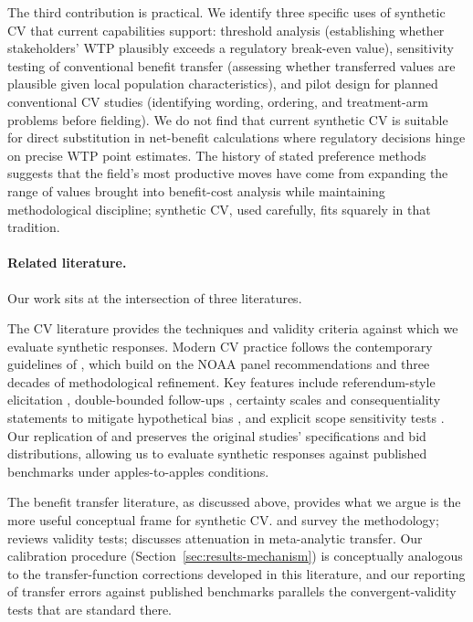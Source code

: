 \documentclass[12pt]{article}
\begin{document}
The third contribution is practical. We identify three specific uses of synthetic CV that current capabilities support: threshold analysis (establishing whether stakeholders' WTP plausibly exceeds a regulatory break-even value), sensitivity testing of conventional benefit transfer (assessing whether transferred values are plausible given local population characteristics), and pilot design for planned conventional CV studies (identifying wording, ordering, and treatment-arm problems before fielding). We do not find that current synthetic CV is suitable for direct substitution in net-benefit calculations where regulatory decisions hinge on precise WTP point estimates. The history of stated preference methods suggests that the field's most productive moves have come from expanding the range of values brought into benefit-cost analysis while maintaining methodological discipline; synthetic CV, used carefully, fits squarely in that tradition.

\paragraph{Related literature.} Our work sits at the intersection of three literatures.

The CV literature provides the techniques and validity criteria against which we evaluate synthetic responses. Modern CV practice follows the contemporary guidelines of \textcite{Johnston2017}, which build on the NOAA panel recommendations \parencite{Arrow1993} and three decades of methodological refinement. Key features include referendum-style elicitation \parencite{Carson2007}, double-bounded follow-ups \parencite{Hanemann1991}, certainty scales and consequentiality statements to mitigate hypothetical bias \parencite{Cummings1999, Vossler2009, Herriges2010}, and explicit scope sensitivity tests \parencite{Carson1996, Heberlein2005}. Our replication of \textcite{Aldy2012} and \textcite{Giguere2020} preserves the original studies' specifications and bid distributions, allowing us to evaluate synthetic responses against published benchmarks under apples-to-apples conditions.

The benefit transfer literature, as discussed above, provides what we argue is the more useful conceptual frame for synthetic CV. \textcite{Rosenberger2017} and \textcite{Boyle2010} survey the methodology; \textcite{Loomis2015} reviews validity tests; \textcite{Bergstrom2008} discusses attenuation in meta-analytic transfer. Our calibration procedure (Section~\ref{sec:results-mechanism}) is conceptually analogous to the transfer-function corrections developed in this literature, and our reporting of transfer errors against published benchmarks parallels the convergent-validity tests that are standard there.
\end{document}
